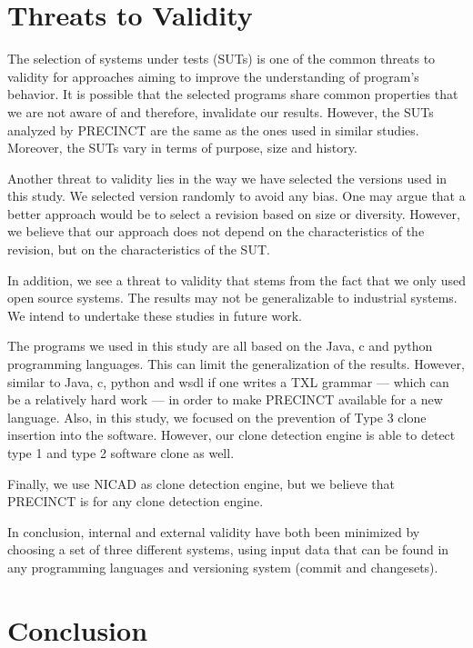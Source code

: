 \documentclass[conference]{IEEEtran}
\begin{document}
\section{Threats to Validity}
\label{sec:Threats to Validity}

The selection of systems under tests (SUTs) is one of the common threats to validity for approaches aiming to improve the understanding of program's behavior.
It is possible that the selected programs share common properties that we are not aware of and therefore, invalidate our results.
However, the SUTs analyzed by PRECINCT are the same as the ones used in similar studies.
Moreover, the SUTs vary in terms of purpose, size and history.

Another threat to validity lies in the way we have selected the versions used in this study.
We selected version randomly to avoid any bias.
One may argue that a better approach would be to select a revision based on size or diversity.
However, we believe that our approach does not depend on the characteristics of the revision, but on the characteristics of the SUT.

In addition, we see a threat to validity that stems from the fact that we only used open source systems. The results may not be generalizable to industrial systems. We intend to undertake these studies in future work.

The programs we used in this study are all based on the Java, c and python programming languages. This can limit the generalization of the results. However, similar to Java, c, python and wsdl if one writes a TXL grammar --- which can be a relatively hard work --- in order to make PRECINCT available for a new language.
Also, in this study, we focused on the prevention of Type 3 clone insertion into the software. However, our clone detection engine is able to detect type 1 and type 2 software clone as well.

Finally, we use NICAD as clone detection engine, but we believe that PRECINCT is  for any clone detection engine.

In conclusion, internal and external validity have both been minimized by choosing a set of three different systems, using input data that can be found in any programming languages and versioning system (commit and changesets).



\section{Conclusion}
\label{sec:Conclusion}
\end{document}
